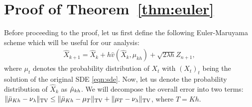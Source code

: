 





\section{Proof of Theorem~\ref{thm:euler}}

Before proceeding to the proof, let us first define the following Euler-Maruyama scheme which will be useful for our analysis:
\begin{align}
\hat{X}_{k+1}  = \hat{X}_k + h \hat{v}(\hat{X}_k, \mu_{kh}) + \sqrt{2\lambda h}Z_{n+1},
\end{align}
where $\mu_t$ denotes the probability distribution of $X_t$ with $(X_t)_t$ being the solution of the original SDE \eqref{eqn:sde}. Now, let us denote the probability distribution of $\hat{X}_k$ as $\hat{\mu}_{kh}$. 
%
We will decompose the overall error into two terms: $\| \bar{\mu}_{Kh} - \nu_\lambda \|_{\textnormal{TV}} \leq \| \bar{\mu}_{Kh} - \mu_{T} \|_{\textnormal{TV}} + \| \mu_{T} - \nu_\lambda \|_{\textnormal{TV}}$, where $T = Kh$. 


